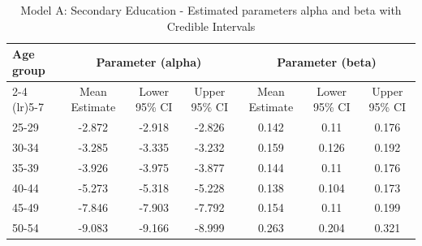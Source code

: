 \begin{landscape}
\begin{table}[htbp]
\centering
\caption{Model A: Secondary Education - Estimated parameters alpha and beta  with Credible Intervals}
\label{tab:Fparameters_ab3}
\begin{tabular}{@{}lcccccc@{}}
\toprule
Age group & \multicolumn{3}{c}{Parameter (alpha)} & \multicolumn{3}{c}{Parameter (beta)} \\ 
\cmidrule(lr){2-4} \cmidrule(lr){5-7}
          & Mean Estimate & Lower 95\% CI & Upper 95\% CI & Mean Estimate & Lower 95\% CI & Upper 95\% CI \\ 
\midrule
25-29 & -2.872 & -2.918 & -2.826 & 0.142 & 0.11 & 0.176 \\
30-34 & -3.285 & -3.335 & -3.232 & 0.159 & 0.126 & 0.192 \\
35-39 & -3.926 & -3.975 & -3.877 & 0.144 & 0.11 & 0.176 \\
40-44 & -5.273 & -5.318 & -5.228 & 0.138 & 0.104 & 0.173 \\
45-49 & -7.846 & -7.903 & -7.792 & 0.154 & 0.11 & 0.199 \\
50-54 & -9.083 & -9.166 & -8.999 & 0.263 & 0.204 & 0.321 \\
\bottomrule
\end{tabular}
\end{table}
\end{landscape}